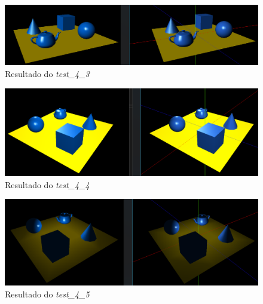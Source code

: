 \documentclass[runningheads]{llncs}
\begin{document}
    \begin{landscape}
        \begin{figure}
            \centering
            \includegraphics[width=\linewidth]{assets/testes/teste_4_3.png}
            \caption{Resultado do \textit{test_4_3}} \label{fig:teste_4_3}
        \end{figure}
    \end{landscape}

    \begin{landscape}
        \begin{figure}
            \centering
            \includegraphics[width=\linewidth]{assets/testes/teste_4_4.png}
            \caption{Resultado do \textit{test_4_4}} \label{fig:teste_4_4}
        \end{figure}
    \end{landscape}

    \begin{landscape}
        \begin{figure}
            \centering
            \includegraphics[width=\linewidth]{assets/testes/teste_4_5.png}
            \caption{Resultado do \textit{test_4_5}} \label{fig:teste_4_5}
        \end{figure}
    \end{landscape}
\end{document}
